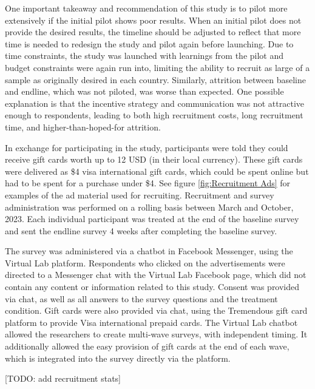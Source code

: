 \documentclass{article}
\begin{document}
One important takeaway and recommendation of this study is to pilot more extensively if the initial pilot shows poor results. When an initial pilot does not provide the desired results, the timeline should be adjusted to reflect that more time is needed to redesign the study and pilot again before launching. Due to time constraints, the study was launched with learnings from the pilot and budget constraints were again run into, limiting the ability to recruit as large of a sample as originally desired in each country. Similarly, attrition between baseline and endline, which was not piloted, was worse than expected. One possible explanation is that the incentive strategy and communication was not attractive enough to respondents, leading to both high recruitment costs, long recruitment time, and higher-than-hoped-for attrition.

In exchange for participating in the study, participants were told they could receive gift cards worth up to 12 USD (in their local currency). These gift cards were delivered as \$4 visa international gift cards, which could be spent online but had to be spent for a purchase under \$4. See figure \ref{fig:Recruitment Ads} for examples of the ad material used for recruiting. Recruitment and survey administration was performed on a rolling basis between March and October, 2023. Each individual participant was treated at the end of the baseline survey and sent the endline survey 4 weeks after completing the baseline survey.

The survey was administered via a chatbot in Facebook Messenger, using the Virtual Lab platform. Respondents who clicked on the advertisements were directed to a Messenger chat with the Virtual Lab Facebook page, which did not contain any content or information related to this study. Consent was provided via chat, as well as all answers to the survey questions and the treatment condition. Gift cards were also provided via chat, using the Tremendous gift card platform to provide Visa international prepaid cards. The Virtual Lab chatbot allowed the researchers to create multi-wave surveys, with independent timing. It additionally allowed the easy provision of gift cards at the end of each wave, which is integrated into the survey directly via the platform.

[TODO: add recruitment stats]
\end{document}
